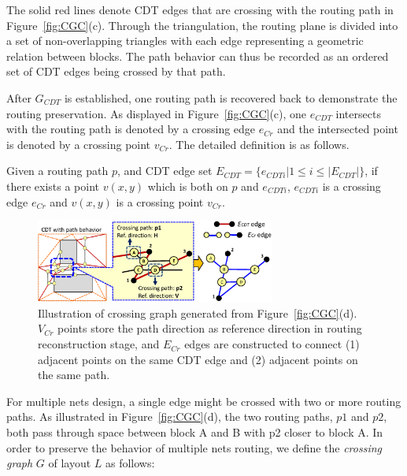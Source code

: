       The solid red lines denote CDT edges that are crossing with the routing path in Figure~\ref{fig:CGC}(c). Through the triangulation, the routing plane is divided into a set of non-overlapping triangles with each edge representing a geometric relation between blocks. The path behavior can thus be recorded as an ordered set of CDT edges being crossed by that path.

      After $G_{CDT}$ is established, one routing path is recovered back to demonstrate the routing preservation. As displayed in Figure~\ref{fig:CGC}(c), one $e_{CDT}$ intersects with the routing path is denoted by a crossing edge $e_{Cr}$ and the intersected point is denoted by a crossing point $v_{Cr}$. The detailed definition is as follows.

      \begin{defi}\label{defi:CrossingPoint}
        Given a routing path $p$, and CDT edge set $E_{CDT}= \{e_{CDTi}| 1 \leq i\leq|E_{CDT}|\}$, if there exists a point $v(x,y)$ which is both on $p$ and $e_{CDTi}$, $e_{CDTi}$ is a crossing edge $e_{Cr}$ and $v(x,y)$ is a crossing point $v_{Cr}$.
      \end{defi}

      \begin{figure}
        \begin{center}
        \includegraphics[width=0.7\textwidth]{Fig/Chapter4/CrG.eps}
        \caption{Illustration of crossing graph generated from Figure~\ref{fig:CGC}(d).
          $V_{Cr}$ points store the path direction as reference direction in routing reconstruction stage, 
          and $E_{Cr}$ edges are constructed to connect (1) adjacent points on the same CDT edge and (2) adjacent points on the same path.}
        \label{fig:CrG}
        \end{center}
      \end{figure}


      For multiple nets design, a single edge might be crossed with two or more routing paths. As illustrated in Figure~\ref{fig:CGC}(d), the two routing paths, $p1$ and $p2$, both pass through space between block A and B with p2 closer to block A. In order to preserve the behavior of multiple nets routing, we define the {\it crossing graph} $G$ of layout $L$ as follows: 

